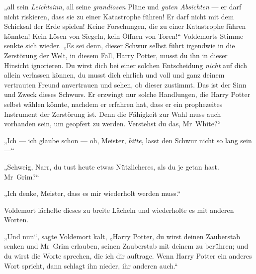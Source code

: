 „all sein \emph{Leichtsinn}, all seine \emph{grandiosen} Pläne und \emph{guten Absichten} — er darf nicht riskieren, dass sie zu einer Katastrophe führen! Er darf nicht mit dem Schicksal der Erde spielen! Keine Forschungen, die zu einer Katastrophe führen könnten! Kein Lösen von Siegeln, kein Öffnen von Toren!“
Voldemorts Stimme senkte sich wieder.
„Es sei denn, dieser Schwur selbst führt irgendwie in die Zerstörung der Welt, in diesem Fall, Harry Potter, musst du ihn in dieser Hinsicht ignorieren. Du wirst dich bei einer solchen Entscheidung \emph{nicht} auf dich allein verlassen können, du musst dich ehrlich und voll und ganz deinem vertrauten Freund anvertrauen und sehen, ob dieser zustimmt. Das ist der Sinn und Zweck dieses Schwurs. Er erzwingt nur solche Handlungen, die Harry Potter selbst wählen könnte, nachdem er erfahren hat, dass er ein prophezeites Instrument der Zerstörung ist. Denn die Fähigkeit zur Wahl muss auch vorhanden sein, um geopfert zu werden. Verstehst du das, Mr~White?“

„Ich — ich glaube schon — oh, Meister, \emph{bitte}, lasst den Schwur nicht so lang sein —“

„Schweig, Narr, du tust heute etwas Nützlicheres, als du je getan hast. Mr~Grim?“

„Ich denke, Meister, dass es mir wiederholt werden muss.“

Voldemort lächelte dieses zu breite Lächeln und wiederholte es mit anderen Worten.

„Und nun“, sagte Voldemort kalt,
„Harry Potter, du wirst deinen Zauberstab senken und Mr~Grim erlauben, seinen Zauberstab mit deinem zu berühren; und du wirst die Worte sprechen, die ich dir auftrage. Wenn Harry Potter ein anderes Wort spricht, dann schlagt ihn nieder, ihr anderen auch.“

